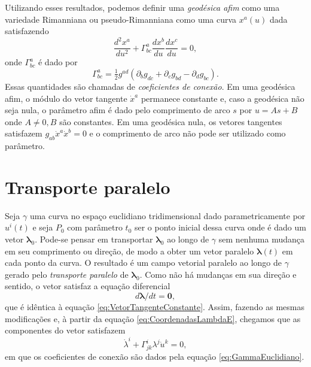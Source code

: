 Utilizando esses resultados, podemos definir uma \textit{geodésica afim} como uma variedade Rimanniana ou pseudo-Rimanniana como uma curva $ x^a(u) $ dada satisfazendo
\begin{equation}\label{eq:GeodesicaAfimPseudoRimanniana}
\boxed{
	\frac{d^{2} x^{a}}{d u^{2}}+\Gamma_{b c}^{a} \frac{d x^{b}}{d u} \frac{d x^{c}}{d u}=0 ,
}
\end{equation}
onde $ \Gamma^{a}_{bc} $ é dado por
\begin{equation}\label{eq:Gamma}
	\boxed{
	\Gamma_{b c}^{a}=\tfrac{1}{2} g^{a d}\left(\partial_{b} g_{d c}+\partial_{c} g_{b d}-\partial_{d} g_{b c}\right) .}
\end{equation}
Essas quantidades são chamadas de \textit{coeficientes de conexão}.
Em uma geodésica afim, o módulo do vetor tangente $ \dot{x}^a $ permanece constante e, caso a geodésica não seja nula, o parâmetro afim é dado pelo comprimento de arco $ s $ por $ u=As+B $ onde $ A\neq0,B $ são constantes. Em uma geodésica nula, os vetores tangentes satisfazem $ g_{a b} \dot{x}^{a} \dot{x}^{b}=0 $ e o comprimento de arco não pode ser utilizado como parâmetro.

 
\section{Transporte paralelo}\label{sec:TransporteParalelo} %

Seja $ \gamma $ uma curva no espaço euclidiano tridimensional dado parametricamente por $ u^i(t) $ e seja $ P_0 $ com parâmetro $ t_0 $ ser o ponto inicial dessa curva onde é dado um vetor $ \boldsymbol{\lambda}_0 $. Pode-se pensar em transportar $ \boldsymbol{\lambda}_0 $ ao longo de $ \gamma $ sem nenhuma mudança em seu comprimento ou direção, de modo a obter um vetor paralelo $ \boldsymbol{\lambda}(t) $ em cada ponto da curva. O resultado é um campo vetorial paralelo ao longo de $ \gamma $ gerado pelo \textit{transporte paralelo} de $ \boldsymbol{\lambda}_0 $. Como não há mudanças em sua direção e sentido, o vetor satisfaz a equação diferencial 
\begin{equation}\label{eq:TransporteParalelo}
d \boldsymbol{\lambda} / d t=\mathbf{0}  ,
\end{equation}
que é idêntica à equação \eqref{eq:VetorTangenteConstante}. Assim, fazendo as mesmas modificações e, à partir da equação \eqref{eq:CoordenadasLambdaE}, chegamos que as componentes do vetor satisfazem 
\begin{equation}\label{eq:CoordenadasLambda}
\dot{\lambda}^{i}+\Gamma_{j k}^{i} \lambda^{j} \dot{u}^{k}=0 ,
\end{equation}
em que os coeficientes de conexão são dados pela equação \eqref{eq:GammaEuclidiano}.


